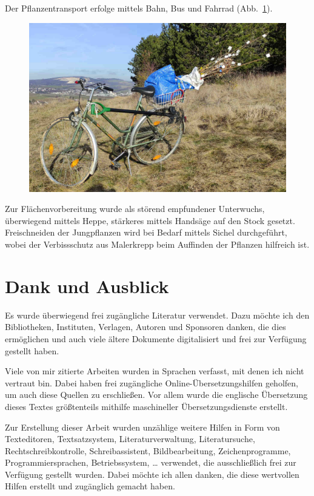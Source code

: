 \documentclass[twocolumn]{scrartcl}
\begin{document}
Der Pflanzentransport erfolge mittels Bahn, Bus und Fahrrad
(Abb.~\ref{fig:fahrradPflanzung}).

\begin{figure}[htbp]
  \centering
  \includegraphics[width=.9\linewidth]{./bild/fahrradPflanzung}
  \label{fig:fahrradPflanzung}
\end{figure}

Zur Flächenvorbereitung wurde als störend empfundener Unterwuchs,
überwiegend mittels Heppe, stärkeres mittels Handsäge auf den Stock
gesetzt. Freischneiden der Jungpflanzen wird bei Bedarf mittels Sichel
durchgeführt, wobei der Verbissschutz aus Malerkrepp beim Auffinden
der Pflanzen hilfreich ist.

\section*{Dank und Ausblick}

Es wurde überwiegend frei zugängliche Literatur verwendet. Dazu möchte
ich den Bibliotheken, Instituten, Verlagen, Autoren und Sponsoren
danken, die dies ermöglichen und auch viele ältere Dokumente
digitalisiert und frei zur Verfügung gestellt haben.

Viele von mir zitierte Arbeiten wurden in Sprachen verfasst, mit denen
ich nicht vertraut bin. Dabei haben frei zugängliche
Online-Übersetzungshilfen geholfen, um auch diese Quellen zu
erschließen. Vor allem wurde die englische Übersetzung dieses Textes
größtenteils mithilfe maschineller Übersetzungsdienste erstellt.

Zur Erstellung dieser Arbeit wurden unzählige weitere Hilfen in Form
von Texteditoren, Textsatzsystem, Literaturverwaltung, Literatursuche,
Rechtschreibkontrolle, Schreibassistent, Bildbearbeitung,
Zeichenprogramme, Programmiersprachen, Betriebssystem, \dots
verwendet, die ausschließlich frei zur Verfügung gestellt
wurden. Dabei möchte ich allen danken, die diese wertvollen Hilfen
erstellt und zugänglich gemacht haben.
\end{document}
